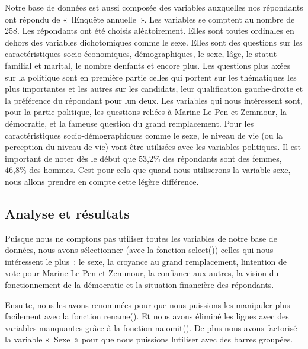 \documentclass[
  letterpaper,
  DIV=11,
  numbers=noendperiod]{scrartcl}
\begin{document}
Notre base de données est aussi composée des variables auxquelles nos
répondants ont répondu de «~l\textquotesingle Enquête annuelle~». Les
variables se comptent au nombre de 258. Les répondants ont été choisis
aléatoirement. Elles sont toutes ordinales en dehors des variables
dichotomiques comme le sexe. Elles sont des questions sur les
caractéristiques socio-économiques, démographiques, le sexe,
l\textquotesingle âge, le statut familial et marital, le nombre
d\textquotesingle enfants et encore plus. Les questions plus axées sur
la politique sont en première partie celles qui portent sur les
thématiques les plus importantes et les autres sur les candidats, leur
qualification gauche-droite et la préférence du répondant pour
l\textquotesingle un deux. Les variables qui nous intéressent sont, pour
la partie politique, les questions reliées à Marine Le Pen et Zemmour,
la démocratie, et la fameuse question du grand remplacement. Pour les
caractéristiques socio-démographiques comme le sexe, le niveau de vie
(ou la perception du niveau de vie) vont être utilisées avec les
variables politiques. Il est important de noter dès le début que 53,2\%
des répondants sont des femmes, 46,8\% des hommes. C\textquotesingle est
pour cela que quand nous utiliserons la variable sexe, nous allons
prendre en compte cette légère différence. ~

\hypertarget{analyse-et-ruxe9sultats}{%
\subsection{Analyse et résultats}\label{analyse-et-ruxe9sultats}}

Puisque nous ne comptons pas utiliser toutes les variables de notre base
de données, nous avons sélectionner (avec la fonction select()) celles
qui nous intéressent le plus~: le sexe, la croyance au grand
remplacement, l\textquotesingle intention de vote pour Marine Le Pen et
Zemmour, la confiance aux autres, la vision du fonctionnement de la
démocratie et la situation financière des répondants.

Ensuite, nous les avons renommées pour que nous puissions les manipuler
plus facilement avec la fonction rename(). Et nous avons éliminé les
lignes avec des variables manquantes grâce à la fonction na.omit(). De
plus nous avons factorisé la variable «~Sexe~» pour que nous puissions
l\textquotesingle utiliser avec des barres groupées.
\end{document}
